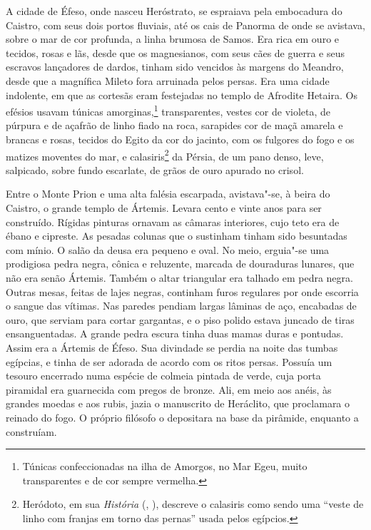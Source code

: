 A cidade de Éfeso, onde nasceu Heróstrato, se espraiava pela embocadura do
Caistro, com seus dois portos fluviais, até os cais de Panorma de onde se
avistava, sobre o mar de cor profunda, a linha brumosa de Samos. Era rica
em ouro e tecidos, rosas e lãs, desde que os magnesianos, com seus cães de
guerra e seus escravos lançadores de dardos, tinham sido vencidos às
margens do Meandro, desde que a magnífica Mileto fora arruinada pelos
persas. Era uma cidade indolente, em que as cortesãs eram festejadas no
templo de Afrodite Hetaira. Os efésios usavam túnicas amorginas,\footnote{
Túnicas confeccionadas na ilha de Amorgos, no Mar Egeu, muito
transparentes e de cor sempre vermelha.} transparentes, vestes
cor de violeta, de púrpura e de açafrão de linho fiado na roca, sarapides
cor de maçã amarela e brancas e rosas, tecidos do Egito da cor do jacinto,
com os fulgores do fogo e os matizes moventes do mar, e
calasiris\footnote{ Heródoto, em sua \textit{História} (, ),
descreve o calasiris como sendo uma “veste de linho com franjas em torno
das pernas” usada pelos egípcios.} da Pérsia, de um pano denso,
leve, salpicado, sobre fundo escarlate, de grãos de ouro apurado no
crisol.

Entre o Monte Prion e uma alta falésia escarpada, avistava"-se, à beira do
Caistro, o grande templo de Ártemis. Levara cento e vinte anos para ser
construído. Rígidas pinturas ornavam as câmaras interiores, cujo teto era
de ébano e cipreste. As pesadas colunas que o sustinham tinham sido
besuntadas com mínio. O salão da deusa era pequeno e oval. No meio,
erguia"-se uma prodigiosa pedra negra, cônica e reluzente, marcada de
douraduras lunares, que não era senão Ártemis. Também o altar triangular
era talhado em pedra negra. Outras mesas, feitas de lajes negras,
continham furos regulares por onde escorria o sangue das vítimas. Nas
paredes pendiam largas lâminas de aço, encabadas de ouro, que serviam para
cortar gargantas, e o piso polido estava juncado de tiras ensanguentadas.
A grande pedra escura tinha duas mamas duras e pontudas. Assim era a
Ártemis de Éfeso. Sua divindade se perdia na noite das tumbas egípcias, e
tinha de ser adorada de acordo com os ritos persas. Possuía um tesouro
encerrado numa espécie de colmeia pintada de verde, cuja porta piramidal
era guarnecida com pregos de bronze. Ali, em meio aos anéis, às grandes
moedas e aos rubis, jazia o manuscrito de Heráclito, que proclamara o
reinado do fogo. O próprio filósofo o depositara na base da pirâmide,
enquanto a construíam.

